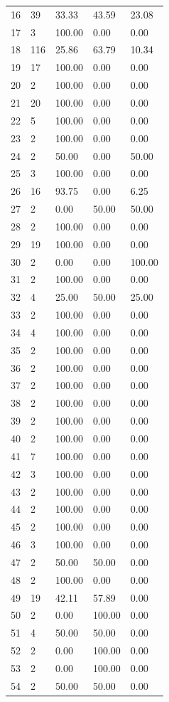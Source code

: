 \documentclass[a4paper,12pt]{article}
\begin{document}
\begin{tabularx}{}{@{}lllll@{}}
16 & 39 & 33.33 & 43.59 & 23.08 \\
17 & 3 & 100.00 & 0.00 & 0.00 \\
18 & 116 & 25.86 & 63.79 & 10.34 \\
19 & 17 & 100.00 & 0.00 & 0.00 \\
20 & 2 & 100.00 & 0.00 & 0.00 \\
21 & 20 & 100.00 & 0.00 & 0.00 \\
22 & 5 & 100.00 & 0.00 & 0.00 \\
23 & 2 & 100.00 & 0.00 & 0.00 \\
24 & 2 & 50.00 & 0.00 & 50.00 \\
25 & 3 & 100.00 & 0.00 & 0.00 \\
26 & 16 & 93.75 & 0.00 & 6.25 \\
27 & 2 & 0.00 & 50.00 & 50.00 \\
28 & 2 & 100.00 & 0.00 & 0.00 \\
29 & 19 & 100.00 & 0.00 & 0.00 \\
30 & 2 & 0.00 & 0.00 & 100.00 \\
31 & 2 & 100.00 & 0.00 & 0.00 \\
32 & 4 & 25.00 & 50.00 & 25.00 \\
33 & 2 & 100.00 & 0.00 & 0.00 \\
34 & 4 & 100.00 & 0.00 & 0.00 \\
35 & 2 & 100.00 & 0.00 & 0.00 \\
36 & 2 & 100.00 & 0.00 & 0.00 \\
37 & 2 & 100.00 & 0.00 & 0.00 \\
38 & 2 & 100.00 & 0.00 & 0.00 \\
39 & 2 & 100.00 & 0.00 & 0.00 \\
40 & 2 & 100.00 & 0.00 & 0.00 \\
41 & 7 & 100.00 & 0.00 & 0.00 \\
42 & 3 & 100.00 & 0.00 & 0.00 \\
43 & 2 & 100.00 & 0.00 & 0.00 \\
44 & 2 & 100.00 & 0.00 & 0.00 \\
45 & 2 & 100.00 & 0.00 & 0.00 \\
46 & 3 & 100.00 & 0.00 & 0.00 \\
47 & 2 & 50.00 & 50.00 & 0.00 \\
48 & 2 & 100.00 & 0.00 & 0.00 \\
49 & 19 & 42.11 & 57.89 & 0.00 \\
50 & 2 & 0.00 & 100.00 & 0.00 \\
51 & 4 & 50.00 & 50.00 & 0.00 \\
52 & 2 & 0.00 & 100.00 & 0.00 \\
53 & 2 & 0.00 & 100.00 & 0.00 \\
54 & 2 & 50.00 & 50.00 & 0.00 \\
\end{tabularx}
\end{document}
